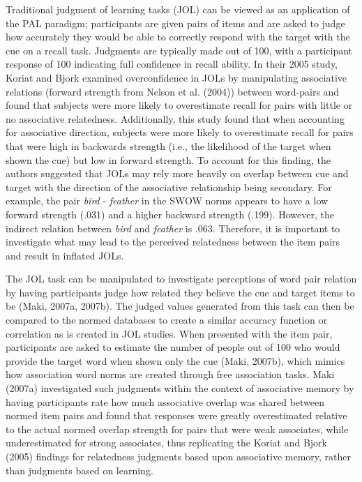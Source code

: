 \documentclass[english,,man]{apa6}
\begin{document}
Traditional judgment of learning tasks (JOL) can be viewed as an application of the PAL paradigm; participants are given pairs of items and are asked to judge how accurately they would be able to correctly respond with the target with the cue on a recall task. Judgments are typically made out of 100, with a participant response of 100 indicating full confidence in recall ability. In their 2005 study, Koriat and Bjork examined overconfidence in JOLs by manipulating associative relations (forward strength from Nelson et al. (2004)) between word-pairs and found that subjects were more likely to overestimate recall for pairs with little or no associative relatedness. Additionally, this study found that when accounting for associative direction, subjects were more likely to overestimate recall for pairs that were high in backwards strength (i.e., the likelihood of the target when shown the cue) but low in forward strength. To account for this finding, the authors suggested that JOLs may rely more heavily on overlap between cue and target with the direction of the associative relationship being secondary. For example, the pair \emph{bird} - \emph{feather} in the SWOW norms appears to have a low forward strength (.031) and a higher backward strength (.199). However, the indirect relation between \emph{bird} and \emph{feather} is .063. Therefore, it is important to investigate what may lead to the perceived relatedness between the item pairs and result in inflated JOLs.

The JOL task can be manipulated to investigate perceptions of word pair relation by having participants judge how related they believe the cue and target items to be (Maki, 2007a, 2007b). The judged values generated from this task can then be compared to the normed databases to create a similar accuracy function or correlation as is created in JOL studies. When presented with the item pair, participants are asked to estimate the number of people out of 100 who would provide the target word when shown only the cue (Maki, 2007b), which mimics how association word norms are created through free association tasks. Maki (2007a) investigated such judgments within the context of associative memory by having participants rate how much associative overlap was shared between normed item pairs and found that responses were greatly overestimated relative to the actual normed overlap strength for pairs that were weak associates, while underestimated for strong associates, thus replicating the Koriat and Bjork (2005) findings for relatedness judgments based upon associative memory, rather than judgments based on learning.
\end{document}
